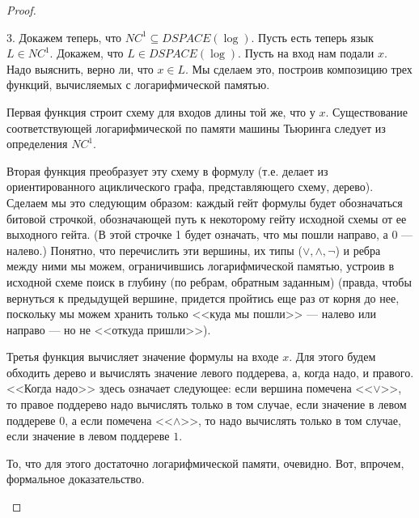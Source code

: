 \begin{proof}
\begin{enumerate}
3. Докажем теперь, что $NC^1 \subseteq DSPACE(\log)$. 
Пусть есть теперь язык $L \in NC^1$. Докажем, что $L\in DSPACE(\log)$. 
Пусть на вход нам подали $x$. Надо выяснить, верно ли, что
$x\in L$. Мы сделаем это, построив композицию трех функций, вычисляемых
с логарифмической памятью.

Первая функция строит схему для входов длины той же, что у $x$.
Существование соответствующей логарифмической по памяти машины Тьюринга
следует из определения $NC^1$.

Вторая функция преобразует эту схему в формулу
(т.е. делает из ориентированного ациклического графа, 
представляющего схему, дерево). Сделаем
мы это следующим образом: каждый гейт формулы будет 
обозначаться битовой строчкой, обозначающей путь к некоторому гейту
исходной схемы от ее выходного гейта.
(В этой строчке 1 будет означать, что мы пошли направо, а 0 --- налево.)
Понятно, что перечислить эти вершины, их типы ($\lor, \land, \lnot$) 
и ребра между ними мы можем, ограничившись логарифмической памятью,
устроив в исходной схеме поиск в глубину (по ребрам, обратным заданным)
(правда, чтобы вернуться к предыдущей вершине, придется пройтись еще
раз от корня до нее, поскольку мы можем хранить только <<куда мы пошли>> ---
налево или направо --- но не <<откуда пришли>>).

Третья функция вычисляет значение формулы на входе $x$. 
Для этого будем обходить дерево и вычислять значение левого поддерева,
а, когда надо, и правого. <<Когда надо>> здесь означает
следующее: если вершина помечена <<$\lor$>>, 
то правое поддерево надо вычислять только в том случае, если значение в левом 
поддереве $0$, а если помечена <<$\land$>>, то надо вычислять 
только в том случае, если значение в левом поддереве $1$. 

То, что для этого достаточно логарифмической памяти, очевидно.
Вот, впрочем, формальное доказательство.


\end{enumerate}
\end{proof}
